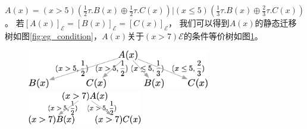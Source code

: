 \begin{example}\label{eg:conditional}
   $A(x)=(x>5)(\frac{1}{2}\tau.B(x)\oplus\frac{1}{2}\tau.C(x))|(x\leq 5)(\frac{1}{3}\tau.B(x)\oplus\frac{2}{3}\tau.C(x))$。
   若$[A(x)]_{\mathcal{E}}=[B(x)]_{\mathcal{E}}=[C(x)]_{\mathcal{E}}$，
   我们可以得到$A(x)$的静态迁移树如图\ref{fig:eg_condition}，$A(x)$关于$(x>7)\mathcal{E}$的条件等价树如图\ref{fig:eg_condition2}。

\begin{figure}[!htp]
   \begin{minipage}{0.6\textwidth}
   \centering
   \includegraphics[width=8cm]{../figures/example_condition.png}
   \caption{}
  \label{fig:eg_condition}
\end{minipage}\hfill
\begin{minipage}{0.45\textwidth}
   \centering
   \includegraphics[width=5cm]{../figures/example_condition2.png}
   \caption{}
   \label{fig:eg_condition2}
\end{minipage}
 \end{figure}
\end{example}

